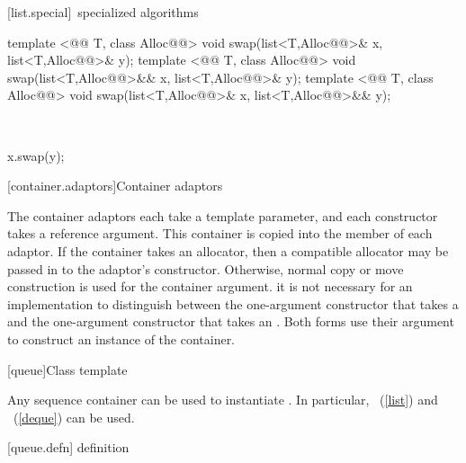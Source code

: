 \documentclass[american,twoside]{book}
\begin{document}
[list.special]{\ specialized algorithms}

\begin{itemdecl}
template <@@ T, class Alloc@@>
  void swap(list<T,Alloc@@>& x, list<T,Alloc@@>& y);
template <@@ T, class Alloc@@>
  void swap(list<T,Alloc@@>&& x, list<T,Alloc@@>& y);
template <@@ T, class Alloc@@>
  void swap(list<T,Alloc@@>& x, list<T,Alloc@@>&& y);
\end{itemdecl}

\begin{itemdescr}
\pnum
\effects\ 
\begin{codeblock}
x.swap(y);
\end{codeblock}
\end{itemdescr}

[container.adaptors]{Container adaptors}

\pnum
The container adaptors each take a  template parameter, and each constructor takes a  reference argument. This container is copied into the  member of each adaptor. If the container takes an allocator, then a compatible allocator may be passed in to the adaptor's constructor. Otherwise, normal copy or move construction is used for the container argument. \enternote it is not necessary for an implementation to distinguish between the one-argument constructor that takes a  and the one-argument constructor that takes an . Both forms use their argument to construct an instance of the container. \exitnote

[queue]{Class template }

\pnum
{}%
Any sequence container 
can be used to instantiate
.
In particular,
\
(\ref{list})
and
\
(\ref{deque})
can be used.

[queue.defn]{ definition}
\end{document}
